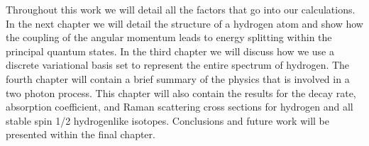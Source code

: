 Throughout this work we will detail all the factors that go into our calculations. In the next chapter we will detail the structure of a hydrogen atom and show how the coupling of the angular momentum leads to energy splitting within the principal quantum states. In the third chapter we will discuss how we use a discrete variational basis set to represent the entire spectrum of hydrogen. The fourth chapter will contain a brief summary of the physics that is involved in a two photon process. This chapter will also contain the results for the decay rate, absorption coefficient, and Raman scattering cross sections for hydrogen and all stable spin 1/2 hydrogenlike isotopes. Conclusions and future work will be presented within the final chapter.


















